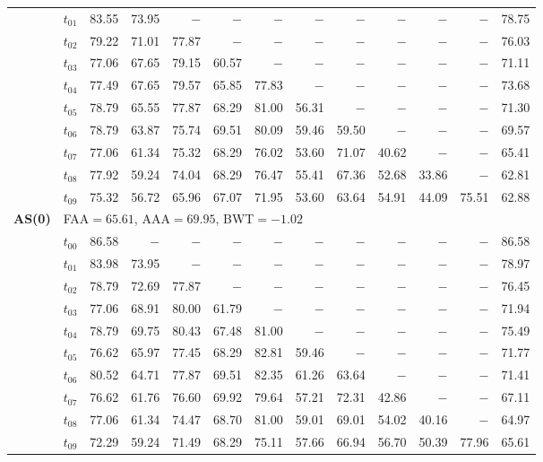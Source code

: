\begin{table}[ht]
\begin{tabular}{@{}l l r r r r r r r r r r r@{}}
 & $t_{01}$ & 83.55 & 73.95 & $-$ & $-$ & $-$ & $-$ & $-$ & $-$ & $-$ & $-$ & 78.75 \\
 & $t_{02}$ & 79.22 & 71.01 & 77.87 & $-$ & $-$ & $-$ & $-$ & $-$ & $-$ & $-$ & 76.03 \\
 & $t_{03}$ & 77.06 & 67.65 & 79.15 & 60.57 & $-$ & $-$ & $-$ & $-$ & $-$ & $-$ & 71.11 \\
 & $t_{04}$ & 77.49 & 67.65 & 79.57 & 65.85 & 77.83 & $-$ & $-$ & $-$ & $-$ & $-$ & 73.68 \\
 & $t_{05}$ & 78.79 & 65.55 & 77.87 & 68.29 & 81.00 & 56.31 & $-$ & $-$ & $-$ & $-$ & 71.30 \\
 & $t_{06}$ & 78.79 & 63.87 & 75.74 & 69.51 & 80.09 & 59.46 & 59.50 & $-$ & $-$ & $-$ & 69.57 \\
 & $t_{07}$ & 77.06 & 61.34 & 75.32 & 68.29 & 76.02 & 53.60 & 71.07 & 40.62 & $-$ & $-$ & 65.41 \\
 & $t_{08}$ & 77.92 & 59.24 & 74.04 & 68.29 & 76.47 & 55.41 & 67.36 & 52.68 & 33.86 & $-$ & 62.81 \\
 & $t_{09}$ & 75.32 & 56.72 & 65.96 & 67.07 & 71.95 & 53.60 & 63.64 & 54.91 & 44.09 & 75.51 & 62.88 \\
\midrule
\multirow{11}{*}{\textbf{AS(0)}} & \multicolumn{12}{l}{\quad\small FAA$=65.61$,\; AAA$=69.95$,\; BWT$=-1.02$} \\
 & $t_{00}$ & 86.58 & $-$ & $-$ & $-$ & $-$ & $-$ & $-$ & $-$ & $-$ & $-$ & 86.58 \\
 & $t_{01}$ & 83.98 & 73.95 & $-$ & $-$ & $-$ & $-$ & $-$ & $-$ & $-$ & $-$ & 78.97 \\
 & $t_{02}$ & 78.79 & 72.69 & 77.87 & $-$ & $-$ & $-$ & $-$ & $-$ & $-$ & $-$ & 76.45 \\
 & $t_{03}$ & 77.06 & 68.91 & 80.00 & 61.79 & $-$ & $-$ & $-$ & $-$ & $-$ & $-$ & 71.94 \\
 & $t_{04}$ & 78.79 & 69.75 & 80.43 & 67.48 & 81.00 & $-$ & $-$ & $-$ & $-$ & $-$ & 75.49 \\
 & $t_{05}$ & 76.62 & 65.97 & 77.45 & 68.29 & 82.81 & 59.46 & $-$ & $-$ & $-$ & $-$ & 71.77 \\
 & $t_{06}$ & 80.52 & 64.71 & 77.87 & 69.51 & 82.35 & 61.26 & 63.64 & $-$ & $-$ & $-$ & 71.41 \\
 & $t_{07}$ & 76.62 & 61.76 & 76.60 & 69.92 & 79.64 & 57.21 & 72.31 & 42.86 & $-$ & $-$ & 67.11 \\
 & $t_{08}$ & 77.06 & 61.34 & 74.47 & 68.70 & 81.00 & 59.01 & 69.01 & 54.02 & 40.16 & $-$ & 64.97 \\
 & $t_{09}$ & 72.29 & 59.24 & 71.49 & 68.29 & 75.11 & 57.66 & 66.94 & 56.70 & 50.39 & 77.96 & 65.61 \\

\end{tabular}
\end{table}
